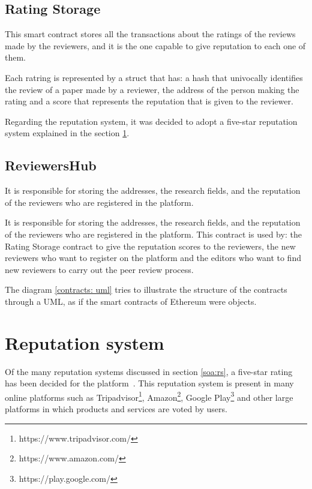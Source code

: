 \subsection*{Rating Storage}

This smart contract stores all the transactions about the ratings of the reviews
made by the reviewers, and it is the one capable to give reputation to each one
of them.

Each ratring is represented by a struct that has: a hash that univocally
identifies the review of a paper made by a reviewer, the address of the person
making the rating and a score that represents the reputation that is given to
the reviewer.

Regarding the reputation system, it was decided to adopt a five-star reputation
system explained in the section \ref{rep:system}.

\subsection*{ReviewersHub}

It is responsible for storing the addresses, the research fields, and the
reputation of the reviewers who are registered in the platform.

It is responsible for storing the addresses, the research fields, and the
reputation of the reviewers who are registered in the platform. This contract is
used by: the Rating Storage contract to give the reputation scores to the
reviewers, the new reviewers who want to register on the platform and the
editors who want to find new reviewers to carry out the peer review process.

The diagram \ref{contracts: uml} tries to illustrate the structure of the
contracts through a UML, as if the smart contracts of Ethereum were
objects.


\section{Reputation system}
\label{rep:system}

Of the many reputation systems discussed in section \ref{soa:rs}, a five-star
rating has been decided for the platform~\cite{kinateder2003architecture}. This
reputation system is present in many online platforms such as
Tripadvisor\footnote{https://www.tripadvisor.com/},
Amazon\footnote{https://www.amazon.com/}, Google
Play\footnote{https://play.google.com/} and other large platforms in which
products and services are voted by users.

